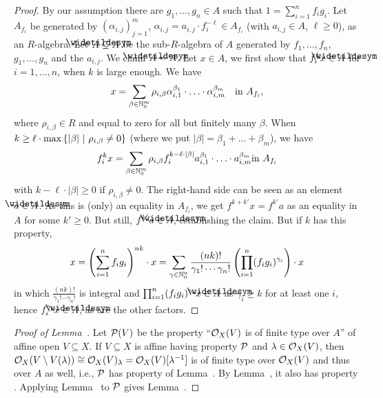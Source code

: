 \documentclass[a4paper,parskip=half,numbers=enddot, DIV=12]{scrreprt}
\begin{document}
\begin{proof}
    By our assumption there are $g_1,\ldots,g_n\in A$ such that $1=\sum_{i=1}^n f_ig_i$. Let $A_{f_i}$ be generated by $(\alpha_{i,j})_{j=1}^m$, $\alpha_{i,j} = a_{i,j}\cdot f_i^{-\ell}\in A_{f_i}$ (with $a_{i,j}\in A$, $\ell\geq0$), as an $R$-algebra. Let $\snake A\subseteq A$ be the sub-$R$-algebra of $A$ generated by $f_1,\ldots,f_n$, $g_1,\ldots,g_n$ and the  $a_{i,j}$. We claim $\snake A = A$. Let $x\in A$, we first show that $f_i^kx \in \snake A$ for $i=1,\ldots, n$, when $k$ is large enough. We have 
    \begin{align*}
        x = \sum_{\beta \in \mathbb{N}_0^m} \rho_{i,\beta} \alpha_{i,1}^{\beta_1}\cdot\ldots\cdot \alpha_{i,m}^{\beta_m}\quad\text{in }A_{f_i}\text{,}
    \end{align*}
    where $\rho_{i,\beta}\in R$ and equal to zero for all but finitely many $\beta$. When $k\geq \ell\cdot \max\left\{|\beta|\ \middle|\  \rho_{i,\beta}\neq 0\right\}$ (where we put $|\beta|=\beta_1+\ldots+\beta_m$), we have
    \begin{align*}
        f_i^kx = \sum_{\beta \in \mathbb{N}_0^m} \rho_{i,\beta}f_i^{k-\ell\cdot|\beta|} a_{i,1}^{\beta_1}\cdot\ldots\cdot a_{i,m}^{\beta_m}\text{in }A_{f_i}
    \end{align*}
    with $k-\ell\cdot|\beta|\geq 0$ if $\rho_{i,\beta}\neq 0$. The right-hand side can be seen as an element $a\in\snake{A}$. As this is (only) an equality in $A_{f_i}$, we get $f^{k+k'}x=f^{k'}a$ as an equality in $A$ for some $k'\geq0$. But still, $f^{k'}a\in\snake{A}$, establishing the claim. But if $k$ has this property,
    \begin{align*}
        x = \left(\sum_{i=1}^n f_ig_i\right)^{nk}\cdot x= \sum_{\gamma\in\mathbb{N}_0^n} \frac{(nk)!}{\gamma_1!\cdots\gamma_n!} \left(\prod_{i=1}^n (f_ig_i)^{\gamma_i}\right)\cdot x
    \end{align*}
    in which $\frac{(nk)!}{\gamma_1!\cdots\gamma_n!}$ is integral and $\prod_{i=1}^n (f_ig_i)^{\gamma_i}x\in \snake A$ as $\gamma_i\geq k$ for at least one $i$, hence $f_i^{\gamma_i}x\in\snake A$, as are the other factors.
\end{proof}

\begin{proof}[Proof of Lemma~]
    Let $\mathcal{P}(V)$ be the property ``$\mathcal{O}_X(V)$ is of finite type over $A$'' of affine open $V\subseteq X$. If $V\subseteq X$ is affine having property $\mathcal{P}$ and $\lambda\in\mathcal{O}_X(V)$, then $\mathcal{O}_X(V\setminus V(\lambda))\cong\mathcal{O}_X(V)_\lambda=\mathcal{O}_X(V)[\lambda^{-1}]$ is of finite type over $\mathcal{O}_X(V)$ and thus over $A$ as well, i.e., $\mathcal{P}$ has property \itememph{\alpha} of Lemma~. By Lemma~, it also has property \itememph{\beta}. Applying Lemma~ to $\mathcal{P}$ gives Lemma~.
\end{proof}
\end{document}
